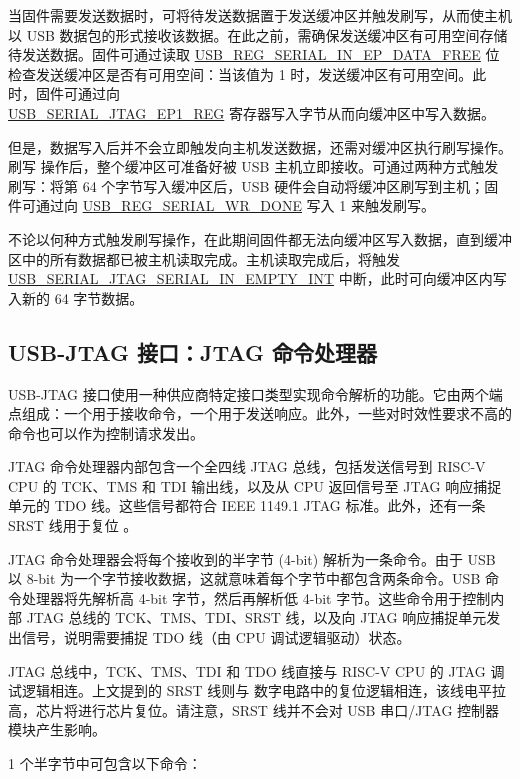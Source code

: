 \documentclass[main\_\_CN.tex]{subfiles}
\begin{document}
当固件需要发送数据时，可将待发送数据置于发送缓冲区并触发刷写，从而使主机以 USB 数据包的形式接收该数据。在此之前，需确保发送缓冲区有可用空间存储待发送数据。固件可通过读取 \hyperref[fielddesc:USBSERIALJTAGSERIALINEPDATAFREE]{USB\_REG\_SERIAL\_IN\_EP\_DATA\_FREE} 位检查发送缓冲区是否有可用空间：当该值为 1 时，发送缓冲区有可用空间。此时，固件可通过向 \\\hyperref[fielddesc:USBSERIALJTAGRDWRBYTE]{USB\_SERIAL\_JTAG\_EP1\_REG} 寄存器写入字节从而向缓冲区中写入数据。

但是，数据写入后并不会立即触发向主机发送数据，还需对缓冲区执行刷写操作。刷写 操作后，整个缓冲区可准备好被 USB 主机立即接收。可通过两种方式触发刷写：将第 64 个字节写入缓冲区后，USB 硬件会自动将缓冲区刷写到主机；固件可通过向 \hyperref[fielddesc:USBSERIALJTAGWRDONE]{USB\_REG\_SERIAL\_WR\_DONE} 写入 1 来触发刷写。

不论以何种方式触发刷写操作，在此期间固件都无法向缓冲区写入数据，直到缓冲区中的所有数据都已被主机读取完成。主机读取完成后，将触发 \hyperref[fielddesc:USBSERIALJTAGSERIALINEMPTYINTRAW]{USB\_SERIAL\_JTAG\_SERIAL\_IN\_EMPTY\_INT} 中断，此时可向缓冲区内写入新的 64 字节数据。

\subsection{USB-JTAG 接口：JTAG 命令处理器}    

USB-JTAG 接口使用一种供应商特定接口类型实现命令解析的功能。它由两个端点组成：一个用于接收命令，一个用于发送响应。此外，一些对时效性要求不高的命令也可以作为控制请求发出。

JTAG 命令处理器内部包含一个全四线 JTAG 总线，包括发送信号到 RISC-V CPU 的 TCK、TMS 和 TDI 输出线，以及从 CPU 返回信号至 JTAG 响应捕捉单元的 TDO 线。这些信号都符合 IEEE 1149.1 JTAG 标准。此外，还有一条 SRST 线用于复位 \chipname{}。

JTAG 命令处理器会将每个接收到的半字节 (4-bit) 解析为一条命令。由于 USB 以 8-bit 为一个字节接收数据，这就意味着每个字节中都包含两条命令。USB 命令处理器将先解析高 4-bit 字节，然后再解析低 4-bit 字节。这些命令用于控制内部 JTAG 总线的 TCK、TMS、TDI、SRST 线，以及向 JTAG 响应捕捉单元发出信号，说明需要捕捉 TDO 线（由 CPU 调试逻辑驱动）状态。

JTAG 总线中，TCK、TMS、TDI 和 TDO 线直接与 RISC-V CPU 的 JTAG 调试逻辑相连。上文提到的 SRST 线则与 \chipname{} 数字电路中的复位逻辑相连，该线电平拉高，芯片将进行芯片复位。请注意，SRST 线并不会对 USB 串口/JTAG 控制器模块产生影响。

1 个半字节中可包含以下命令：
\end{document}
